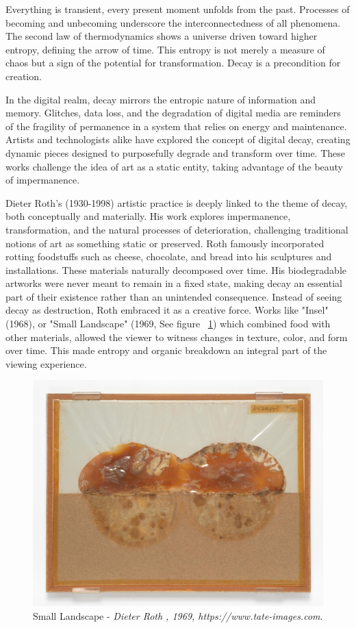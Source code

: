 Everything is transient, every present moment unfolds from the past. Processes of becoming and unbecoming underscore the interconnectedness of all phenomena. The second law of thermodynamics shows a universe driven toward higher entropy, defining the arrow of time. This entropy is not merely a measure of chaos but a sign of the potential for transformation. Decay is a precondition for creation.

In the digital realm, decay mirrors the entropic nature of information and memory. Glitches, data loss, and the degradation of digital media are reminders of the fragility of permanence in a system that relies on energy and maintenance. Artists and technologists alike have explored the concept of digital decay, creating dynamic pieces designed to purposefully degrade and transform over time. These works challenge the idea of art as a static entity, taking advantage of the beauty of impermanence.


Dieter Roth’s  (1930-1998) artistic practice is deeply linked to the theme of decay, both conceptually and materially. His work explores impermanence, transformation, and the natural processes of deterioration, challenging traditional notions of art as something static or preserved. Roth famously incorporated rotting foodstuffs such as cheese, chocolate, and bread into his sculptures and installations. These materials naturally decomposed over time. His biodegradable artworks were never meant to remain in a fixed state, making decay an essential part of their existence rather than an unintended consequence. Instead of seeing decay as destruction, Roth embraced it as a creative force. Works like "Insel" (1968), or "Small Landscape" (1969, See figure ~\ref{fig:roth}) which combined food with other materials, allowed the viewer to witness changes in texture, color, and form over time. This made entropy and organic breakdown an integral part of the viewing experience.


\begin{figure}
    \centering
    \includegraphics[width=0.8\linewidth]{assets/roth.jpg} 
    \caption{\small Small Landscape - \textit{Dieter Roth , 1969, https://www.tate-images.com}.}
    \label{fig:roth}
\end{figure}

